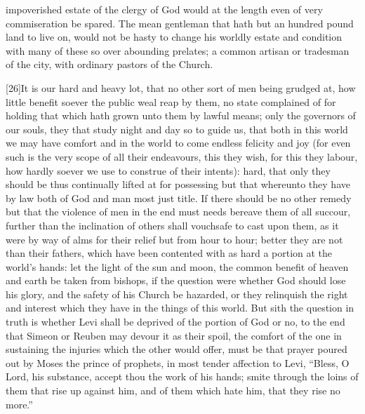 impoverished estate of the clergy of God would at the length even of very commiseration be spared. The mean gentleman that hath but an hundred pound land to live on, would not be hasty to change his worldly estate and condition with many of these so over abounding prelates; a common artisan or tradesman of the city, with ordinary pastors of the Church.

[26]It is our hard and heavy lot, that no other sort of men being grudged at, how little benefit soever the public weal reap by them, no state complained of for holding that which hath grown unto them by lawful means; only the governors of our souls, they that study night and day so to guide us, that both in this world we may have comfort and in the world to come endless felicity and joy (for even such is the very scope of all their endeavours, this they wish, for this they labour, how hardly soever we use to construe of their intents): hard, that only they should be thus continually lifted at for possessing but that whereunto they have by law both of God and man most just title. If there should be no other remedy but that the violence of men in the end must needs bereave them of all succour, further than the inclination of others shall vouchsafe to cast upon them, as it were by way of alms for their relief but from hour to hour; better they are not than their fathers, which have been contented with as hard a portion at the world’s hands: let the light of the sun and moon, the common benefit of heaven and earth be taken from bishops, if the question were whether God should lose his glory, and the safety of his  Church be hazarded, or they relinquish the right and interest which they have in the things of this world. But sith the question in truth is whether Levi shall be deprived of the portion of God or no, to the end that Simeon or Reuben may devour it as their spoil, the comfort of the one in sustaining the injuries which the other would offer, must be that prayer poured out by Moses the prince of prophets, in most tender affection to Levi, “Bless, O Lord, his substance, accept thou the work of his hands; smite through the loins of them that rise up against him, and of them which hate him, that they rise no more.”

